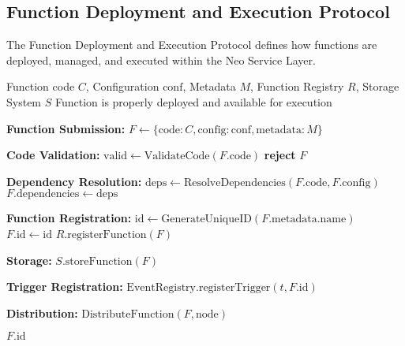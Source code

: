 \subsection{Function Deployment and Execution Protocol}
\label{subsec:function-protocol}

The Function Deployment and Execution Protocol defines how functions are deployed, managed, and executed within the Neo Service Layer.

\begin{protocol}
\label{prot:function-deployment}
\begin{algorithmic}[1]
\Require Function code $C$, Configuration $\text{conf}$, Metadata $M$, Function Registry $R$, Storage System $S$
\Ensure Function is properly deployed and available for execution

\State \textbf{Function Submission:}
\State $F \gets \{\text{code}: C, \text{config}: \text{conf}, \text{metadata}: M\}$

\State \textbf{Code Validation:}
\State $\text{valid} \gets \text{ValidateCode}(F.\text{code})$
    \State \textbf{reject} $F$
\EndIf

\State \textbf{Dependency Resolution:}
\State $\text{deps} \gets \text{ResolveDependencies}(F.\text{code}, F.\text{config})$
\State $F.\text{dependencies} \gets \text{deps}$

\State \textbf{Function Registration:}
\State $\text{id} \gets \text{GenerateUniqueID}(F.\text{metadata}.\text{name})$
\State $F.\text{id} \gets \text{id}$
\State $R.\text{registerFunction}(F)$

\State \textbf{Storage:}
\State $S.\text{storeFunction}(F)$

\State \textbf{Trigger Registration:}
    \State $\text{EventRegistry}.\text{registerTrigger}(t, F.\text{id})$
\EndFor

\State \textbf{Distribution:}
    \State $\text{DistributeFunction}(F, \text{node})$
\EndFor

\State \Return $F.\text{id}$
\end{algorithmic}
\end{protocol}

